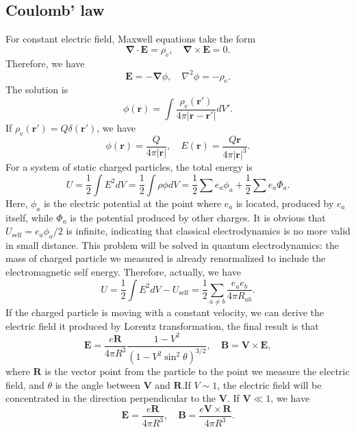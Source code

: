 \subsection{Coulomb' law}
For constant electric field, Maxwell equations take the form 
\[\bm{\nabla} \cdot \bm{E} = \rho_{\mathrm{e}} , \quad \bm{\nabla} \times \bm{E} = 0.\]
Therefore, we have
\[\bm{E} = -\bm{\nabla} \phi , \quad \nabla^2 \phi = -\rho_{\mathrm{e}} .\]
The solution is
\[\phi(\bm{r}) = \int  \frac{\rho_{\mathrm{e}}(\bm{r}')}{4\pi|\bm{r}-\bm{r}'|} dV'.\]
If $\rho_{\mathrm{e}}(\bm{r}') = Q \delta(\bm{r}')$, we have
\[\phi(\bm{r}) =  \frac{Q}{4\pi|\bm{r}|} , \quad E(\bm{r}) = \frac{Q\bm{r}}{4\pi|\bm{r}|^3}.\]
For a system of static charged particles, the total energy is
\[U = \frac{1}{2}\int E^2 dV = \frac{1}{2} \int \rho \phi dV = \frac{1}{2} \sum e_a \phi_a + \frac{1}{2}\sum e_a \Phi_a.\]
Here, $\phi_a$ is the electric potential at the point where $e_a$ is located, produced by $e_a$ itself, while  $\Phi_a$ is the potential produced by other charges. It is obvious that $U_{\mathrm{self}} =  e_a \phi_a/2$ is infinite, indicating that classical electrodynamics is no more valid in small distance. This problem will be solved in quantum electrodynamics: the mass of charged particle we measured is already renormalized to include the electromagnetic self energy. Therefore, actually, we have
\[U = \frac{1}{2}\int E^2 dV - U_{\mathrm{self}} = \frac{1}{2}\sum_{a \ne b} \frac{e_a e_b}{4\pi R_{ab}}.\]
If the charged particle is moving with a constant velocity, we can derive the electric field it produced by Lorentz transformation, the final result is that
\[\bm{E} = \frac{e\bm{R}}{4\pi R^3} \frac{1-V^2}{(1-V^2\sin^2\theta)^{3/2}} , \quad \bm{B} = \bm{V} \times \bm{E},\]
where $\bm{R}$ is the vector point from the particle to the point we measure the electric field, and $\theta$ is the angle between $\bm{V}$ and $\bm{R}$.If $V \sim 1$, the electric field will be concentrated in the direction perpendicular to the $\bm{V}$. If $\bm{V} \ll 1$, we have
\[\bm{E} = \frac{e\bm{R}}{4\pi R^3} , \quad \bm{B} = \frac{e\bm{V} \times\bm{R}}{4\pi R^3}.\]

